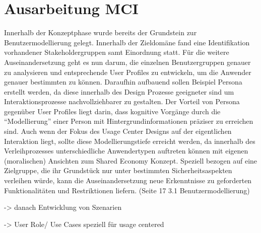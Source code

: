 
\section{Ausarbeitung MCI}

Innerhalb der Konzeptphase wurde bereits der Grundstein zur Benutzermodellierung gelegt. Innerhalb der Zieldomäne  fand eine Identifikation vorhandener Stakeholdergruppen samt Einordnung statt. Für die weitere Auseinandersetzung geht es nun darum, die einzelnen Benutzergruppen genauer zu analysieren und entsprechende User Profiles zu entwickeln, um die Anwender genauer bestimmten zu können. Daraufhin aufbauend sollen Beispiel Persona erstellt werden, da diese innerhalb des Design Prozesse geeigneter sind um Interaktionsprozesse nachvollziehbarer zu gestalten. Der Vorteil von Persona gegenüber User Profiles liegt darin, dass kognitive Vorgänge durch die “Modellierung” einer Person mit Hintergrundinformationen präziser zu erreichen sind. 
Auch wenn der Fokus des Usage Center Designs auf der eigentlichen Interaktion liegt, sollte diese Modellierungstiefe erreicht werden, da innerhalb des Verleihprozesses unterschiedliche Anwendertypen auftreten können mit eigenen (moralischen) Ansichten zum Shared Economy Konzept. Speziell bezogen auf eine Zielgruppe, die ihr Grundstück nur unter bestimmten Sicherheitsaspekten verleihen würde, kann die Auseinandersetzung neue Erkenntnisse zu geforderten Funktionalitäten und Restriktionen liefern. (Seite 17 3.1 Benutzermodellierung)	


-> danach Entwicklung von Szenarien

-> User Role/ Use Cases speziell für usage centered	

\newpage



\newpage



\newpage




\newpage